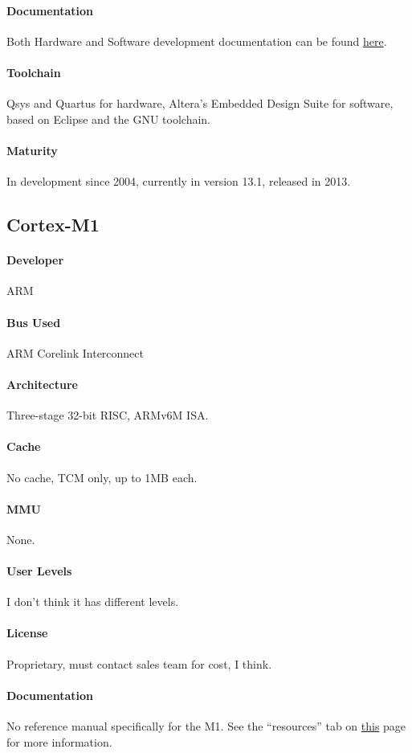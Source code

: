 \paragraph{Documentation} Both Hardware and Software development documentation can be found \href{https://www.altera.com/support/literature/lit-nio2.html}{here}.
\paragraph{Toolchain} Qsys and Quartus for hardware, Altera's Embedded Design Suite for software, based on Eclipse and the GNU toolchain.
\paragraph{Maturity} In development since 2004, currently in version 13.1, released in 2013.

\subsection{Cortex-M1}
\paragraph{Developer} ARM
\paragraph{Bus Used} ARM Corelink Interconnect
\paragraph{Architecture} Three-stage 32-bit RISC, ARMv6M ISA.
\paragraph{Cache} No cache, TCM only, up to 1MB each.
\paragraph{MMU} None.
\paragraph{User Levels} I don't think it has different levels.
\paragraph{License} Proprietary, must contact sales team for cost, I think.
\paragraph{Documentation} No reference manual specifically for the M1. See the ``resources'' tab on \href{http://www.arm.com/products/processors/cortex-m/cortex-m1.php}{this} page for more information.
